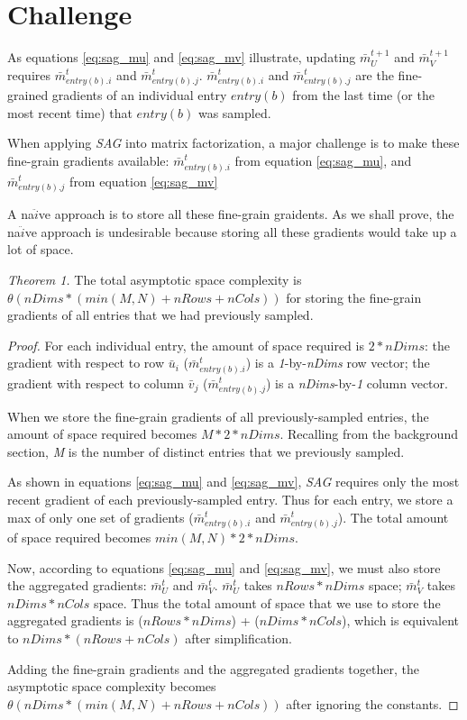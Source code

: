 \section{Challenge}
As equations \ref{eq:sag_mu} and \ref{eq:sag_mv} illustrate, updating $\bar{m}_{U}^{t+1}$ and $\bar{m}_{V}^{t+1}$ requires $\bar{m}_{entry(b).i}^{t}$ and $\bar{m}_{entry(b).j}^{t}$.  
$\bar{m}_{entry(b).i}^{t}$ and $\bar{m}_{entry(b).j}^{t}$ are the fine-grained gradients of an individual entry $entry(b)$ from the last time (or the most recent time) that $entry(b)$ was sampled.  

When applying \emph{SAG} into matrix factorization, a major challenge is to make these fine-grain gradients available: 
$\bar{m}_{entry(b).i}^{t}$ from equation \ref{eq:sag_mu}, and 
$\bar{m}_{entry(b).j}^{t}$ from equation \ref{eq:sag_mv}  

A na$\ddot{i}$ve approach is to store all these fine-grain graidents.  
As we shall prove, the na$\ddot{i}$ve approach is undesirable because storing all these gradients would take up a lot of space.  

\emph{Theorem 1.} 
The total asymptotic space complexity is $\theta(nDims*(min(M,N)+nRows+nCols))$ for storing the fine-grain gradients of all entries that we had previously sampled.  
\begin{proof}
For each individual entry, the amount of space required is $2*nDims$:  
the gradient with respect to row $\bar{u}_i$ ($\bar{m}_{entry(b).i}^{t}$) is a \emph{1}-by-\emph{nDims} row vector;  
the gradient with respect to column $\bar{v}_j$ ($\bar{m}_{entry(b).j}^{t}$) is a \emph{nDims}-by-\emph{1} column vector.  

When we store the fine-grain gradients of all previously-sampled entries, the amount of space required becomes $M*2*nDims$.  
Recalling from the background section, \emph{M} is the number of distinct entries that we previously sampled.  

As shown in equations \ref{eq:sag_mu} and \ref{eq:sag_mv}, \emph{SAG} requires only the most recent gradient of each previously-sampled entry.
Thus for each entry, we store a max of only one set of gradients ($\bar{m}_{entry(b).i}^{t}$ and $\bar{m}_{entry(b).j}^{t}$).
The total amount of space required becomes $min(M,N)*2*nDims$.

Now, according to equations \ref{eq:sag_mu} and \ref{eq:sag_mv}, we must also store the aggregated gradients: $\bar{m}_{U}^{t}$ and $\bar{m}_{V}^{t}$.  
$\bar{m}_{U}^{t}$ takes $nRows*nDims$ space; $\bar{m}_{V}^{t}$ takes $nDims*nCols$ space.  
Thus the total amount of space that we use to store the aggregated gradients is ($nRows*nDims$) + ($nDims*nCols$), which is equivalent to $nDims*(nRows+nCols)$ after simplification. 

Adding the fine-grain gradients and the aggregated gradients together, the asymptotic space complexity becomes $\theta(nDims*(min(M,N)+nRows+nCols))$ after ignoring the constants.  
\end{proof}

